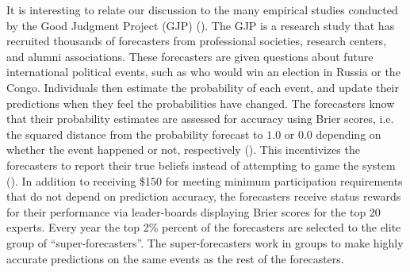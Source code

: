 \documentclass[11pt]{article}
\theoremstyle{definition}
\theoremstyle{definition}
\begin{document}
It is interesting to relate our discussion to the many empirical studies conducted by the Good Judgment Project (GJP) (\citet{mellers2014psychological, ungar2012good}). The GJP is a research study that has recruited thousands of forecasters from professional societies, research centers, and alumni associations. These forecasters are given questions about future international political events, such as who would win an election in Russia or the Congo. Individuals then estimate the probability of each event, and update their predictions when they feel the probabilities have changed. The forecasters know that their probability estimates are assessed for accuracy using Brier scores, i.e. the squared distance from the  probability forecast to $1.0$ or $0.0$ depending on whether the event happened or not, respectively (\citet{Brier}). This incentivizes the forecasters to report their true beliefs instead of attempting to game the system (\citet{winkler1968good}). In addition to receiving \$150 for meeting minimum participation requirements that do not depend on prediction accuracy, the forecasters receive status rewards for their performance via leader-boards displaying Brier scores for the top 20 experts. Every year the top 2\% percent of the forecasters are selected to the elite group of ``super-forecasters''. The super-forecasters work in groups to make highly accurate predictions on the same events as the rest of the forecasters. 


\end{document}

